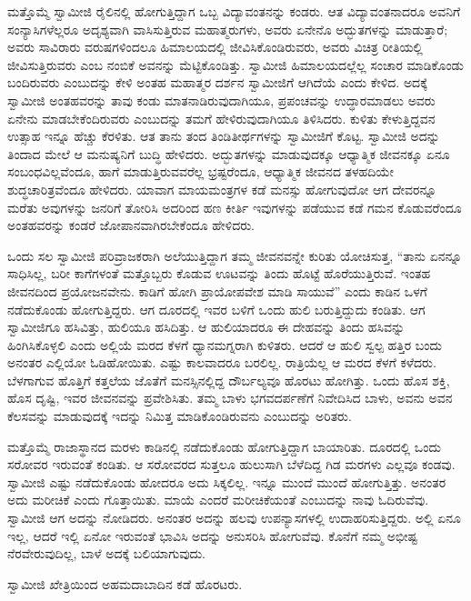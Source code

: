  ಮತ್ತೊಮ್ಮೆ ಸ್ವಾಮೀಜಿ ರೈಲಿನಲ್ಲಿ ಹೋಗುತ್ತಿದ್ದಾಗ ಒಬ್ಬ ವಿದ್ಯಾವಂತನನ್ನು ಕಂಡರು. ಆತ ವಿದ್ಯಾವಂತನಾದರೂ ಅವನಿಗೆ ಸಂನ್ಯಾಸಿಗಳೆಲ್ಲರೂ ಅದೃಶ್ಯವಾಗಿ ವಾಸಿಸುತ್ತಿರುವ ಮಹಾತ್ಮರುಗಳು, ಅವರು ಏನೇನೊ ಅದ್ಭುತಗಳನ್ನು ಮಾಡುತ್ತಾರೆ; ಅವರು ಸಾವಿರಾರು ವರುಷಗಳಿಂದಲೂ ಹಿಮಾಲಯದಲ್ಲಿ ಜೀವಿಸಿಕೊಂಡಿರುವರು, ಅವರು ವಿಚಿತ್ರ ರೀತಿಯಲ್ಲಿ ಜೀವಿಸುತ್ತಿರುವರು ಎಂಬ ನಂಬಿಕೆ ಅವನನ್ನು ಮೆಟ್ಟಿಕೊಂಡಿತ್ತು. ಸ್ವಾಮೀಜಿ ಹಿಮಾಲಯದಲ್ಲೆಲ್ಲ ಸಂಚಾರ ಮಾಡಿಕೊಂಡು ಬಂದಿರುವರು ಎಂಬುದನ್ನು ಕೇಳಿ ಅಂತಹ ಮಹಾತ್ಮರ ದರ್ಶನ ಸ್ವಾಮೀಜಿಗೆ ಆಗಿದೆಯೆ ಎಂದು ಕೇಳಿದ. ಅದಕ್ಕೆ ಸ್ವಾಮೀಜಿ ಅಂತಹವರನ್ನು ತಾವು ಕಂಡು ಮಾತನಾಡಿರುವುದಾಗಿಯೂ, ಪ್ರಪಂಚವನ್ನು ಉದ್ಧಾರಮಾಡಲು ಅವರು ಏನೇನು ಮಾಡಬೇಕೆಂದಿರುವರು ಎಂಬುದನ್ನು ತಮಗೆ ಹೇಳಿರುವುದಾಗಿಯೂ ತಿಳಿಸಿದರು. ಕುಳಿತು ಕೇಳುತ್ತಿದ್ದವನ ಉತ್ಸಾಹ ಇನ್ನೂ ಹೆಚ್ಚು ಕೆರಳಿತು. ಆತ ತಾನು ತಂದ ತಿಂಡಿತೀರ್ಥಗಳನ್ನು ಸ್ವಾಮೀಜಿಗೆ ಕೊಟ್ಟ. ಸ್ವಾಮೀಜಿ ಅದನ್ನು ತಿಂದಾದ ಮೇಲೆ ಆ ಮನುಷ್ಯನಿಗೆ ಬುದ್ಧಿ ಹೇಳಿದರು. ಅದ್ಭುತಗಳನ್ನು ಮಾಡುವುದಕ್ಕೂ ಆಧ್ಯಾತ್ಮಿಕ ಜೀವನಕ್ಕೂ ಏನೂ ಸಂಬಂಧವಿಲ್ಲವೆಂದೂ, ಹಾಗೆ ಮಾಡುತ್ತಿರುವವರೆಲ್ಲ ಭ್ರಷ್ಟರೆಂದೂ, ಆಧ್ಯಾತ್ಮಿಕ ಜೀವನದ ತಳಹದಿಯೇ ಶುದ್ಧಚಾರಿತ್ರವೆಂದೂ ಹೇಳಿದರು. ಯಾವಾಗ ಮಾಯಮಂತ್ರಗಳ ಕಡೆ ಮನಸ್ಸು ಹೋಗುವುದೋ ಆಗ ದೇವರನ್ನೂ ಮರೆತು ಅವುಗಳನ್ನು ಜನರಿಗೆ ತೋರಿಸಿ ಅದರಿಂದ ಹಣ ಕೀರ್ತಿ ಇವುಗಳನ್ನು ಪಡೆಯುವ ಕಡೆ ಗಮನ ಕೊಡುವರೆಂದೂ ಅಂತಹವರನ್ನು ಕಂಡರೆ ಜೋಪಾನವಾಗಿರಬೇಕೆಂದೂ ಹೇಳಿದರು. 

 ಒಂದು ಸಲ ಸ್ವಾಮೀಜಿ ಪರಿವ್ರಾಜಕರಾಗಿ ಅಲೆಯುತ್ತಿದ್ದಾಗ ತಮ್ಮ ಜೀವನವನ್ನೇ ಕುರಿತು ಯೋಚಿಸುತ್ತ, “ತಾನು ಏನನ್ನೂ ಸಾಧಿಸಿಲ್ಲ, ಬರೀ ಕಾಗೆಗಳಂತೆ ಮತ್ತೊಬ್ಬರು ಕೊಡುವ ಊಟವನ್ನು ತಿಂದು ಹೊಟ್ಟೆ ಹೊರೆಯುತ್ತಿರುವೆ. ಇಂತಹ ಜೀವನದಿಂದ ಪ್ರಯೋಜನವೇನು. ಕಾಡಿಗೆ ಹೋಗಿ ಪ್ರಾಯೋಪವೇಶ ಮಾಡಿ ಸಾಯುವೆ” ಎಂದು ಕಾಡಿನ ಒಳಗೆ ನಡೆದುಕೊಂಡು ಹೋಗುತ್ತಿದ್ದರು. ಆಗ ದೂರದಲ್ಲಿ ಇವರ ಬಳಿಗೆ ಒಂದು ಹುಲಿ ಬರುತ್ತಿದ್ದುದು ಕಂಡಿತು. ಆಗ ಸ್ವಾಮೀಜಿಗೂ ಹಸಿವಿತ್ತು, ಹುಲಿಯೂ ಹಸಿದಿತ್ತು. ಆ ಹುಲಿಯಾದರೂ ಈ ದೇಹವನ್ನು ತಿಂದು ಹಸಿವನ್ನು ಹಿಂಗಿಸಿಕೊಳ್ಳಲಿ ಎಂದು ಅಲ್ಲಿಯೆ ಮರದ ಕೆಳಗೆ ಧ್ಯಾನಮಗ್ನರಾಗಿ ಕುಳಿತರು. ಆದರೆ ಆ ಹುಲಿ ಸ್ವಲ್ಪ ಹತ್ತಿರ ಬಂದು ಅನಂತರ ಎಲ್ಲಿಯೋ ಓಡಿಹೋಯಿತು. ಎಷ್ಟು ಕಾಲವಾದರೂ ಬರಲಿಲ್ಲ. ರಾತ್ರಿಯೆಲ್ಲ ಆ ಮರದ ಕೆಳಗೆ ಕಳೆದರು. ಬೆಳಗಾಗುವ ಹೊತ್ತಿಗೆ ಕತ್ತಲೆಯ ಜೊತೆಗೆ ಮನಸ್ಸಿನಲ್ಲಿದ್ದ ದೌರ್ಬಲ್ಯವೂ ಹೊರಟು ಹೋಗಿತ್ತು. ಒಂದು ಹೊಸ ಶಕ್ತಿ, ಹೊಸ ದೃಷ್ಟಿ, ಇವರ ಜೀವನವನ್ನು ಪ್ರವೇಶಿಸಿತು. ತಮ್ಮ ಬಾಳು ಭಗವದರ್ಪಣೆಗೆ ನಿವೇದಿಸಿದ ಬಾಳು, ಅವನು ಅವನ ಕೆಲಸವನ್ನು ಮಾಡುವುದಕ್ಕೆ ಇದನ್ನು ನಿಮಿತ್ತ ಮಾಡಿಕೊಂಡಿರುವನು ಎಂಬುದನ್ನು ಅರಿತರು. 

 ಮತ್ತೊಮ್ಮೆ ರಾಜಾಸ್ಥಾನದ ಮರಳು ಕಾಡಿನಲ್ಲಿ ನಡೆದುಕೊಂಡು ಹೋಗುತ್ತಿದ್ದಾಗ ಬಾಯಾರಿತು. ದೂರದಲ್ಲಿ ಒಂದು ಸರೋವರ ಇರುವಂತೆ ಕಂಡಿತು. ಆ ಸರೋವರದ ಸುತ್ತಲೂ ಹುಲುಸಾಗಿ ಬೆಳೆದಿದ್ದ ಗಿಡ ಮರಗಳು ಎಲ್ಲವೂ ಕಂಡವು. ಸ್ವಾಮೀಜಿ ಎಷ್ಟು ನಡೆದುಕೊಂಡು ಹೋದರೂ ಅದು ಸಿಕ್ಕಲಿಲ್ಲ. ಇನ್ನೂ ಮುಂದೆ ಮುಂದೆ ಹೋಗುತ್ತಿತ್ತು. ಅನಂತರ ಅದು ಮರೀಚಿಕೆ ಎಂದು ಗೊತ್ತಾಯಿತು. ಮಾಯೆ ಎಂದರೆ ಮರೀಚಿಕೆಯಂತೆ ಎಂಬುದನ್ನು ನಾವು ಓದಿರುವೆವು. ಸ್ವಾಮೀಜಿ ಆಗ ಅದನ್ನು ನೋಡಿದರು. ಅನಂತರ ಅದನ್ನು ಹಲವು ಉಪನ್ಯಾಸಗಳಲ್ಲಿ ಉದಾಹರಿಸುತ್ತಿದ್ದರು. ಅಲ್ಲಿ ಏನೂ ಇಲ್ಲ, ಆದರೆ ಇಲ್ಲಿ ಏನೋ ಇರುವಂತೆ ಭಾವಿಸಿ ಅದನ್ನು ಅನುಸರಿಸಿ ಹೋಗುವೆವು. ಕೊನೆಗೆ ನಮ್ಮ ಅಭೀಷ್ಟ ನೆರವೇರುವುದಿಲ್ಲ, ಬಾಳೆ ಅದಕ್ಕೆ ಬಲಿಯಾಗುವುದು. 

 ಸ್ವಾಮೀಜಿ ಖೇತ್ರಿಯಿಂದ ಅಹಮದಾಬಾದಿನ ಕಡೆ ಹೊರಟರು. 

